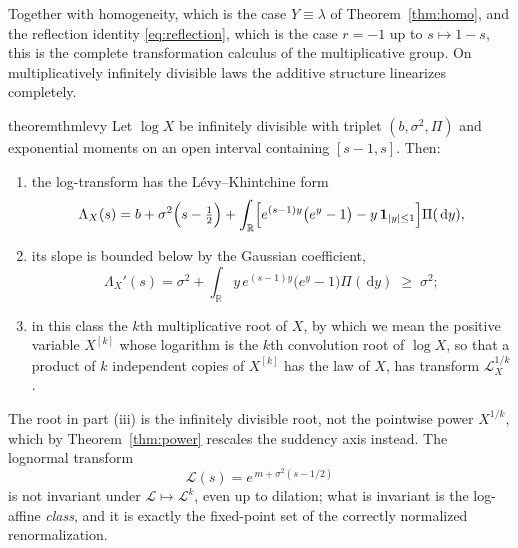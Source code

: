 \documentclass[sn-mathphys-num]{sn-jnl}
\theoremstyle{thmstyleone}%
\theoremstyle{thmstyletwo}%
\theoremstyle{thmstylethree}%
\theoremstyle{thmstyleone}%
\providecommand{\R}{\mathbb{R}}
\providecommand{\Leh}{\mathscr{L}}
\providecommand{\dd}{\,\mathrm{d}}
\begin{document}
	
	Together with homogeneity, which is the case $Y\equiv\lambda$ of
	Theorem~\ref{thm:homo}, and the reflection identity
	\eqref{eq:reflection}, which is the case $r=-1$ up to
	$s\mapsto1-s$, this is the complete transformation calculus of the
	multiplicative group. On multiplicatively infinitely divisible laws
	the additive structure linearizes completely.
	
	\begin{restatable}{theorem}{thmlevy}
		\label{thm:levy}
		Let $\log X$ be infinitely divisible with triplet
		$(b,\sigma^2,\Pi)$ and exponential moments on an open interval
		containing $[s-1,s]$. Then:
		\begin{enumerate}[label=\textup{(\roman*)},leftmargin=2.2em]
			\item the log-transform has the L\'evy--Khintchine form
			\begin{equation}\label{eq:levyL}
				\Lambda_X(s)=b+\sigma^2\Bigl(s-\tfrac12\Bigr)
				+\int_\R\Bigl[e^{(s-1)y}\bigl(e^{y}-1\bigr)
				-y\,\mathbf 1_{|y|\le1}\Bigr]\Pi(\dd y),
			\end{equation}
			\item its slope is bounded below by the Gaussian coefficient,
			\begin{equation}\label{eq:levyderiv}
				\Lambda_X'(s)
				=\sigma^2+\int_\R y\,e^{(s-1)y}\bigl(e^{y}-1\bigr)
				\Pi(\dd y)\;\ge\;\sigma^2 ;
			\end{equation}
			\item in this class the $k$th multiplicative root of $X$, by
			which we mean the positive variable $X^{[k]}$ whose logarithm
			is the $k$th convolution root of $\log X$, so that a product of
			$k$ independent copies of $X^{[k]}$ has the law of $X$, has
			transform $\Leh_X^{1/k}$.
		\end{enumerate}
	\end{restatable}
	
	The root in part (iii) is the infinitely divisible root, not the
	pointwise power $X^{1/k}$, which by Theorem~\ref{thm:power}
	rescales the suddency axis instead. The lognormal transform
	\begin{equation}\label{eq:lognormalcurve}
		\Leh(s)=e^{\,m+\sigma^2(s-1/2)}
	\end{equation}
	is not invariant under $\Leh\mapsto\Leh^{k}$, even up to
	dilation; what is invariant is the log-affine \emph{class}, and it
	is exactly the fixed-point set of the correctly normalized
	renormalization.
	
\end{document}
